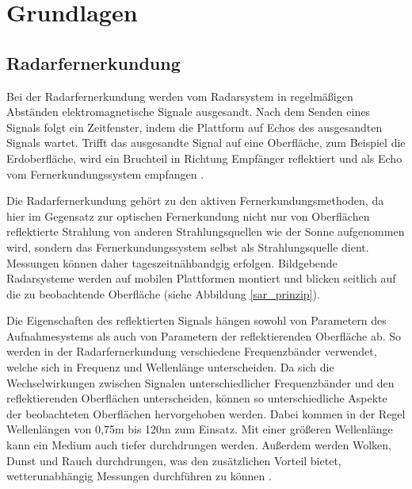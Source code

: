 \newpage
\restoregeometry
\section{Grundlagen}
\subsection{Radarfernerkundung}
Bei der Radarfernerkundung werden vom Radarsystem in regelmäßigen Abständen elektromagnetische Signale ausgesandt. Nach dem Senden eines Signals 
folgt ein Zeitfenster, indem die Plattform auf Echos des ausgesandten Signals wartet.
Trifft das ausgesandte Signal auf eine Oberfläche, zum Beispiel 
die Erdoberfläche, wird ein Bruchteil in Richtung Empfänger reflektiert und als Echo vom Fernerkundungssystem empfangen \cite{tutorial_on_sar}.

Die Radarfernerkundung gehört zu den aktiven Fernerkundungsmethoden, da hier im Gegensatz zur optischen Fernerkundung nicht nur 
von Oberflächen reflektierte Strahlung von anderen Strahlungsquellen wie der Sonne aufgenommen wird, sondern das Fernerkundungssystem 
selbst als Strahlungsquelle dient. Messungen können daher tageszeitnähbandgig erfolgen. Bildgebende Radarsysteme werden auf mobilen Plattformen 
montiert und blicken seitlich auf die zu beobachtende Oberfläche \cite{tutorial_on_sar} (siehe Abbildung \ref{sar_prinzip}). 

Die Eigenschaften des reflektierten Signals hängen sowohl von Parametern des Aufnahmesystems als auch von Parametern der reflektierenden Oberfläche ab.
So werden in der Radarfernerkundung verschiedene Frequenzbänder verwendet, welche sich in Frequenz und Wellenlänge unterscheiden. Da sich die Wechselwirkungen zwischen Signalen 
unterschiedlicher Frequenzbänder und den reflektierenden Oberflächen unterscheiden, können so unterschiedliche Aspekte der beobachteten Oberflächen hervorgehoben werden. 
Dabei kommen in der Regel Wellenlängen von 0,75m bis 120m zum Einsatz. %
Mit einer größeren Wellenlänge kann ein Medium auch tiefer durchdrungen werden. 
Außerdem werden Wolken, Dunst und Rauch durchdrungen, was den zusätzlichen Vorteil bietet, wetterunabhängig Messungen durchführen zu können \cite{einfuehrung_in_fernerkundung}.


